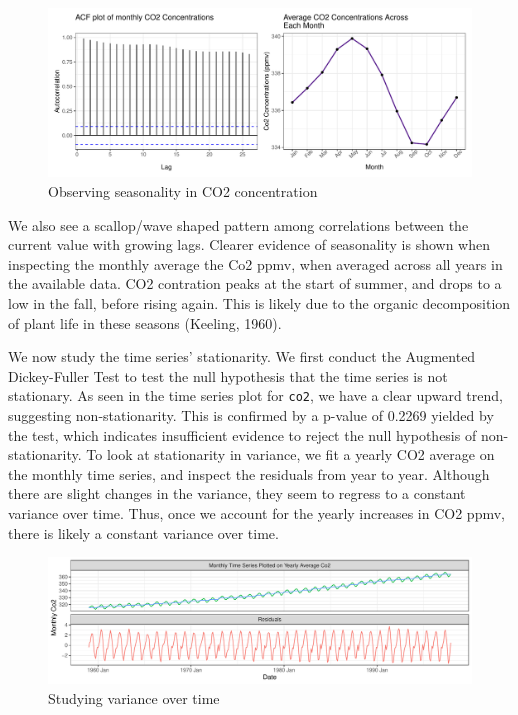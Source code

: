 \documentclass[
]{article}
\begin{document}
\begin{figure}

{\centering \includegraphics[width=1\linewidth]{lab_prompt_Updated_files/figure-latex/seasonality-eda-1} 

}

\caption{Observing seasonality in CO2 concentration}\label{fig:seasonality-eda}
\end{figure}

We also see a scallop/wave shaped pattern among correlations between the current value with growing lags. Clearer evidence of seasonality is shown when inspecting the monthly average the Co2 ppmv, when averaged across all years in the available data. CO2 contration peaks at the start of summer, and drops to a low in the fall, before rising again. This is likely due to the organic decomposition of plant life in these seasons (Keeling, 1960).

We now study the time series' stationarity. We first conduct the Augmented Dickey-Fuller Test to test the null hypothesis that the time series is not stationary. As seen in the time series plot for \texttt{co2}, we have a clear upward trend, suggesting non-stationarity. This is confirmed by a p-value of 0.2269 yielded by the test, which indicates insufficient evidence to reject the null hypothesis of non-stationarity. To look at stationarity in variance, we fit a yearly CO2 average on the monthly time series, and inspect the residuals from year to year. Although there are slight changes in the variance, they seem to regress to a constant variance over time. Thus, once we account for the yearly increases in CO2 ppmv, there is likely a constant variance over time.

\begin{figure}

{\centering \includegraphics[width=1\linewidth]{lab_prompt_Updated_files/figure-latex/seasonality-irregularities-1} 

}

\caption{Studying variance over time}\label{fig:seasonality-irregularities}
\end{figure}
\end{document}
